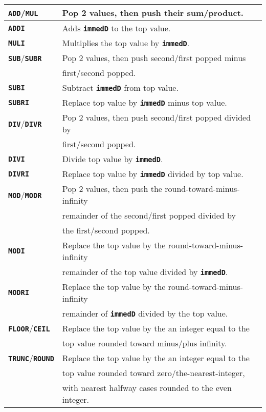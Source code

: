 \documentclass[12pt]{article}
\newcommand{\TT}[1]{{\tt \bfseries #1}}
\newlength{\figurewidth}
\newenvironment{boxedfigure}[1][!btp]%
	{\begin{figure*}[#1]
	 \begin{lrbox}{\figurebox}
	 \begin{minipage}{\figurewidth}

	 \vspace*{1ex}}%
	{
	 \vspace*{1ex}

	 \end{minipage}
	 \end{lrbox}

	 \centering
	 \fbox{\hspace*{0.1in}\usebox{\figurebox}\hspace*{0.1in}}
	 \end{figure*}}
\begin{document}
\begin{boxedfigure}

\begin{center}
\begin{tabular}{|l|l|}
\hline
\TT{ADD}/\TT{MUL}
    & Pop 2 values, then push their sum/product.
\\\hline
\TT{ADDI}
    & Adds \TT{immedD} to the top value.
\\\hline
\TT{MULI}
    & Multiplies the top value by \TT{immedD}.
\\\hline
\TT{SUB}/\TT{SUBR}
    & Pop 2 values, then push second/first popped minus \\
    & first/second popped.
\\\hline
\TT{SUBI}
    & Subtract \TT{immedD} from top value.
\\\hline
\TT{SUBRI}
    & Replace top value by \TT{immedD} minus top value.
\\\hline
\TT{DIV}/\TT{DIVR}
    & Pop 2 values, then push second/first popped divided by\\
    & first/second popped.
\\\hline
\TT{DIVI}
    & Divide top value by \TT{immedD}.
\\\hline
\TT{DIVRI}
    & Replace top value by \TT{immedD} divided by top value.
\\\hline
\TT{MOD}/\TT{MODR}
    & Pop 2 values, then push the round-toward-minus-infinity \\
    & remainder of the second/first popped divided by \\
    & the first/second popped.
\\\hline
\TT{MODI}
    & Replace the top value by the round-toward-minus-infinity \\
    & remainder of the top value divided by \TT{immedD}.
\\\hline
\TT{MODRI}
    & Replace the top value by the round-toward-minus-infinity \\
    & remainder of \TT{immedD} divided by the top value.
\\\hline
\TT{FLOOR}/\TT{CEIL}
    & Replace the top value by the an integer equal to the \\
    & top value rounded toward minus/plus infinity.
\\\hline
\TT{TRUNC}/\TT{ROUND}
    & Replace the top value by the an integer equal to the \\
    & top value rounded toward zero/the-nearest-integer, \\
    & with nearest halfway cases rounded to the even integer.

\end{tabular}
\end{center}
\end{boxedfigure}
\end{document}
